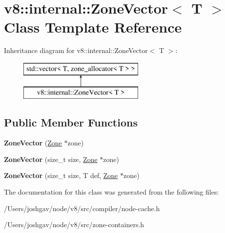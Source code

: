 \hypertarget{classv8_1_1internal_1_1_zone_vector}{}\section{v8\+:\+:internal\+:\+:Zone\+Vector$<$ T $>$ Class Template Reference}
\label{classv8_1_1internal_1_1_zone_vector}
Inheritance diagram for v8\+:\+:internal\+:\+:Zone\+Vector$<$ T $>$\+:\begin{figure}[H]
\begin{center}
\leavevmode
\includegraphics[height=2.000000cm]{classv8_1_1internal_1_1_zone_vector}
\end{center}
\end{figure}
\subsection*{Public Member Functions}
\begin{DoxyCompactItemize}
\item 
{\bfseries Zone\+Vector} (\hyperlink{classv8_1_1internal_1_1_zone}{Zone} $\ast$zone)\hypertarget{classv8_1_1internal_1_1_zone_vector_aacedddc9e2a268b48886c5c32b8ee22b}{}\label{classv8_1_1internal_1_1_zone_vector_aacedddc9e2a268b48886c5c32b8ee22b}

\item 
{\bfseries Zone\+Vector} (size\+\_\+t size, \hyperlink{classv8_1_1internal_1_1_zone}{Zone} $\ast$zone)\hypertarget{classv8_1_1internal_1_1_zone_vector_afe4d9a1b62d89a7d03998073bf94597e}{}\label{classv8_1_1internal_1_1_zone_vector_afe4d9a1b62d89a7d03998073bf94597e}

\item 
{\bfseries Zone\+Vector} (size\+\_\+t size, T def, \hyperlink{classv8_1_1internal_1_1_zone}{Zone} $\ast$zone)\hypertarget{classv8_1_1internal_1_1_zone_vector_a9beed42288384ab6bf5aa0d48c7497e0}{}\label{classv8_1_1internal_1_1_zone_vector_a9beed42288384ab6bf5aa0d48c7497e0}

\end{DoxyCompactItemize}


The documentation for this class was generated from the following files\+:\begin{DoxyCompactItemize}
\item 
/\+Users/joshgav/node/v8/src/compiler/node-\/cache.\+h\item 
/\+Users/joshgav/node/v8/src/zone-\/containers.\+h\end{DoxyCompactItemize}
